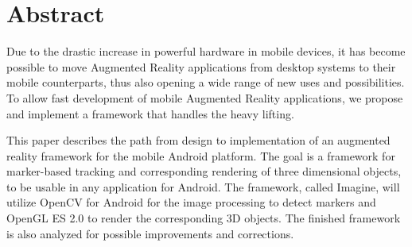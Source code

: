 \section*{Abstract}

Due to the drastic increase in powerful hardware in mobile devices, it has become possible to move Augmented Reality applications from desktop systems to their mobile counterparts, thus also opening a wide range of new uses and possibilities.
To allow fast development of mobile Augmented Reality applications, we propose and implement a framework that handles the heavy lifting.

This paper describes the path from design to implementation of an augmented reality framework for the mobile Android platform.
The goal is a framework for marker-based tracking and corresponding rendering of three dimensional objects, to be usable in any application for Android.
The framework, called Imagine, will utilize OpenCV for Android for the image processing to detect markers and OpenGL ES 2.0 to render the corresponding 3D objects.
The finished framework is also analyzed for possible improvements and corrections.
